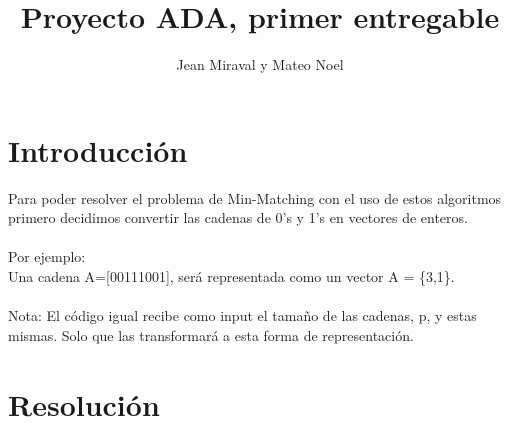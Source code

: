 \documentclass{article}
\title{Proyecto ADA, primer entregable}
\author{Jean Miraval y  Mateo Noel}
\begin{document}
	\maketitle
	\section{Introducción}
	Para poder resolver el problema de Min-Matching con el uso de estos algoritmos primero decidimos convertir las cadenas de 0's y 1's en vectores de enteros.\\\\
	Por ejemplo: \\Una cadena A=[00111001], será representada como un vector  A = \{3,1\}. \\\\
	Nota: El código igual recibe como input el tamaño de las cadenas, p, y estas mismas. Solo que las transformará a esta forma de representación.
	
	\section{Resolución} 
\end{document}

